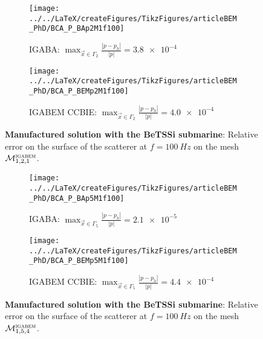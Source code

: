 \begin{figure}
	\centering
	\begin{subfigure}[t]{\textwidth}
		\texttt{[image: ../../LaTeX/createFigures/TikzFigures/articleBEM\_PhD/BCA\_P\_BAp2M1f100]}
		\caption{IGABA: $\displaystyle \max_{\vec{x}\in\Gamma_2}\frac{|p-p_h|}{|p|} = \num{3.8e-4}$}
	\end{subfigure} 
	\par\bigskip
	\begin{subfigure}[t]{\textwidth}
		\texttt{[image: ../../LaTeX/createFigures/TikzFigures/articleBEM\_PhD/BCA\_P\_BEMp2M1f100]}
		\caption{IGABEM CCBIE: $\displaystyle \max_{\vec{x}\in\Gamma_2}\frac{|p-p_h|}{|p|} = \num{4.0e-4}$}
	\end{subfigure} 
	\caption{\textbf{Manufactured solution with the BeTSSi submarine}: Relative error on the surface of the scatterer at $f=\SI{100}{Hz}$ on the mesh ${\cal M}_{1,2,1}^{\textsc{igabem}}$.}
	\label{Fig3:BCA_P_p2M1f100}
\end{figure}


\begin{figure}
	\centering
	\begin{subfigure}[t]{\textwidth}
		\texttt{[image: ../../LaTeX/createFigures/TikzFigures/articleBEM\_PhD/BCA\_P\_BAp5M1f100]}
		\caption{IGABA: $\displaystyle \max_{\vec{x}\in\Gamma_5}\frac{|p-p_h|}{|p|} = \num{2.1e-5}$}
	\end{subfigure} 
	\par\bigskip
	\begin{subfigure}[t]{\textwidth}
		\texttt{[image: ../../LaTeX/createFigures/TikzFigures/articleBEM\_PhD/BCA\_P\_BEMp5M1f100]}
		\caption{IGABEM CCBIE: $\displaystyle \max_{\vec{x}\in\Gamma_5}\frac{|p-p_h|}{|p|} = \num{4.4e-4}$}
	\end{subfigure} 
	\caption{\textbf{Manufactured solution with the BeTSSi submarine}: Relative error on the surface of the scatterer at $f=\SI{100}{Hz}$ on the mesh ${\cal M}_{1,5,4}^{\textsc{igabem}}$.}
	\label{Fig3:BCA_P_p5M1f100}
\end{figure}


